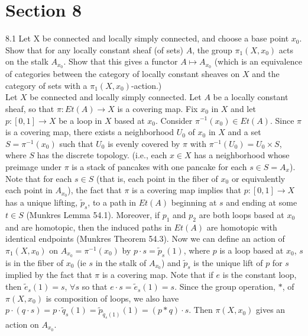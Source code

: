 \newpage
\section*{Section 8}
8.1 Let X be connected and locally simply connected, and choose a base point $x_0$. Show that for any locally constant sheaf (of sets) $A$, the group $\pi_1(X,x_0)$ acts on the stalk $A_{x_0}$. Show that this gives a functor $A \mapsto A_{x_0}$ (which is an equivalence of categories between the category of locally constant sheaves on $X$ and the category of sets with a $\pi_1(X,x_0)$-action.) \\

Let $X$ be connected and locally simply connected. Let $A$ be a locally constant sheaf, so that $\pi:Et(A) \rightarrow X$ is a covering map. Fix $x_0$ in $X$ and let $p:[0,1] \rightarrow X$ be a loop in $X$ based at $x_0$. Consider $\pi^{-1}(x_0) \in Et(A)$. Since $\pi$ is a covering map, there exists a neighborhood $U_0$ of $x_0$ in $X$ and a set $S=\pi^{-1}(x_0)$ such that $U_0$ is evenly covered by $\pi$ with $\pi^{-1}(U_0)=U_0 \times S$, where $S$ has the discrete topology. (i.e., each $x \in X$ has a neighborhood whose preimage under $\pi$ is a stack of pancakes with one pancake for each $s \in S = A_{x}$).\\ 


Note that for each $s \in S$ (that is, each point in the fiber of $x_0$ or equivalently each point in $A_{x_0}$),  the fact that $\pi$ is a covering map implies that $p:[0,1] \rightarrow X$ has a unique lifting, $\tilde{p}_s$, to a path in $Et(A)$ beginning at $s$ and ending at some $t \in S$ (Munkres Lemma 54.1). Moreover, if $p_1$ and $p_2$ are both loops based at $x_0$ and are homotopic, then the induced paths in $Et(A)$ are homotopic with identical endpoints (Munkres Theorem 54.3). Now we can define an action of $\pi_1(X,x_0)$ on $A_{x_0}=\pi^{-1}(x_0)$ by $p \cdot s = \tilde{p}_s(1)$, where $p$ is a loop based at $x_0$, $s$ is in the fiber of $x_0$ (ie $s$ in the stalk of $A_{x_0}$) and $\tilde{p}_s$ is the unique lift of $p$ for $s$ implied by the fact that $\pi$ is a covering map. Note that if $e$ is the constant loop, then $\tilde{e}_s(1) = s$, $\forall s$ so that $e \cdot s = \tilde{e}_s(1)=s$. Since the group operation, $*$, of $\pi(X,x_0)$ is composition of loops, we also have $p \cdot (q \cdot s) = p \cdot \tilde{q}_s(1) = \tilde{p}_{\tilde{q}_s(1)}(1)=(p * q) \cdot s$. Then $\pi(X,x_0)$ gives an action on $A_{x_0}$.\\

